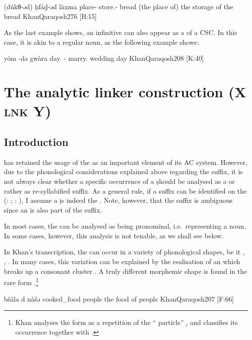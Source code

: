 {(dúkθ-əd) ḥfáḏ̣-əd làxma}
{place-\cst{} store.\inf-\cst{} bread}
{(the place of) the storage of the bread}
{KhanQaraqosh}{276 {[B:15]}}

As the last example shows, an infinitive can also appear as a \secn of a CSC. In this case, it is akin to a regular noun, as the  following example shows:

{yóm -də\cb{} gwàra}
{day.\cst{} -\cst\cb{} marry.\inf}
{wedding day}
{KhanQaraqosh}{208 {[K:40]}}







\section{The analytic linker construction (X \textsc{lnk} Y)} \label{ss:Qar_Lnk}
\subsection{Introduction}
\Qar has retained the usage of the \lnk* as an important element of its AC system. However, due to the phonological considerations explained above regarding the \cst* suffix, it is not always clear whether a specific occurrence of a  \d should be analysed as a \lnk* or rather as re-syllabified \cst* suffix. As a general rule, if a \free* suffix can be identified on the \prim (\sg: ; \pl: ), I assume a  \d is indeed the \lnk*. Note, however, that the \pl* \free*  suffix is ambiguous since an \phonetic[ə] is also part of the \cst* suffix. 

In most cases, the \lnk* can be analysed as being pronominal, i.e.\ representing a noun. In some cases, however, this analysis is not tenable, as we shall see below. 

\largerpage
In Khan's  transcription, the \lnk* can occur in a variety of phonological shapes, be it , , . In many cases, this variation can be explained by the realisation of an  \phonetic[ə] which breaks up a consonant cluster \citep[cf.][64--65]{KhanQaraqosh}. A truly different morphemic shape is found in the rare form .\footnote{Khan analyses the form  as a repetition of the \enquote{ particle} \d, and classifies its occurrence together with .}

{bšála d\cb{} nàšə}
{cooked\_food \lnk\cb{} people}
{the food of people}
{KhanQaraqosh}{207 {[F:66]}}\antipar 
\newpage 

